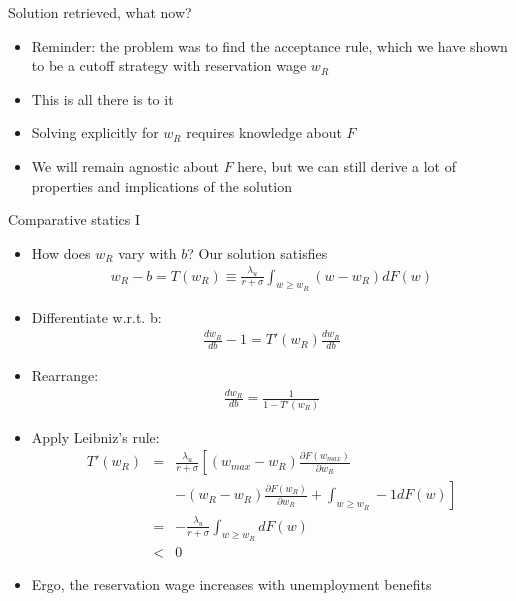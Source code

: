 \documentclass[9pt]{beamer}
\newcommand{\bit}{\begin{itemize}}
\newcommand{\eit}{\end{itemize}}
\newcommand{\bc}{\color{blue}}
\begin{document}
\begin{frame}{Solution retrieved, what now?}

\bit
\setlength\itemsep{1.5em}

\item Reminder: the problem was to find the acceptance rule, which we have shown to be a cutoff strategy with reservation wage $w_R$

\item This is all there is to it

\item Solving explicitly for $w_R$ requires knowledge about $F$

%

\item We will remain agnostic about $F$ here, but we can still derive a lot of properties and implications of the solution

\eit


\end{frame}




\begin{frame}{Comparative statics I}
\small

\bit
\setlength\itemsep{0.25em}

\item How does $w_R$ vary with $b$? Our solution satisfies
\begin{eqnarray}
w_R  -b = T(w_R) \equiv \frac{\lambda_u }{r+\sigma} \int_{w\geq w_R} (w-w_R) dF(w) \nonumber
\end{eqnarray}
\item Differentiate w.r.t. b:
\begin{eqnarray}
\frac{dw_R}{db}  - 1 = T'(w_R) \frac{dw_R}{db} \nonumber
\end{eqnarray}
\item Rearrange:
\begin{eqnarray}
\frac{dw_R}{db} =\frac{1}{1-T'(w_R)}  \nonumber
\end{eqnarray}
\item Apply Leibniz's rule:
\begin{eqnarray}
T'(w_R) &=& \frac{\lambda_u }{r+\sigma}\left[(w_{max}-w_R)\frac{\partial F(w_{max})}{\partial w_R}\right. \nonumber \\
&& \left.- (w_{R}-w_R)\frac{\partial F(w_{R})}{\partial w_R} + \int_{w \geq w_R} -1 dF(w)\right] \nonumber \\
&=& -\frac{\lambda_u }{r+\sigma}\int_{w \geq w_R} dF(w) \nonumber \\
&<& 0 \nonumber
\end{eqnarray}

\item Ergo, {\bc the reservation wage increases with unemployment benefits}
\eit


\end{frame}
\end{document}
